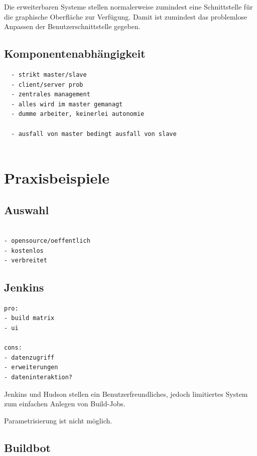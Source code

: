 Die erweiterbaren Systeme stellen normalerweise zumindest eine Schnittstelle
f\"ur die graphische Oberfl\"ache zur Verf\"ugung.
Damit ist zumindest das problemlose Anpassen der Benutzerschnittstelle gegeben.




\subsection{Komponentenabh\"angigkeit}
\begin{verbatim}
  - strikt master/slave
  - client/server prob
  - zentrales management
  - alles wird im master gemanagt
  - dumme arbeiter, keinerlei autonomie

  - ausfall von master bedingt ausfall von slave


\end{verbatim}

\section{Praxisbeispiele}

\subsection{Auswahl}

\begin{verbatim}

- opensource/oeffentlich
- kostenlos
- verbreitet

\end{verbatim}

\subsection{Jenkins}

\begin{verbatim}
pro:
- build matrix
- ui

cons:
- datenzugriff
- erweiterungen
- dateninteraktion?

\end{verbatim}

Jenkins und Hudson stellen ein Benutzerfreundliches,
jedoch limitiertes System zum einfachen Anlegen von Build-Jobs.

Parametrisierung ist nicht möglich.

\subsection{Buildbot}


